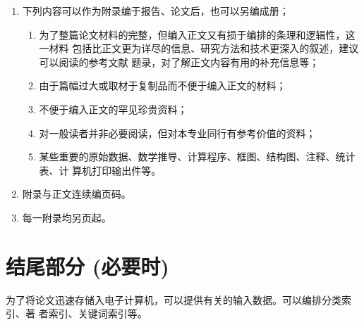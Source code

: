 \documentclass[oneside, phd]{njuthesis}
\begin{document}
\begin{enumerate}
\item 下列内容可以作为附录编于报告、论文后，也可以另编成册；

\begin{enumerate}

\item 为了整篇论文材料的完整，但编入正文又有损于编排的条理和逻辑性，这一材料
包括比正文更为详尽的信息、研究方法和技术更深入的叙述，建议可以阅读的参考文献
题录，对了解正文内容有用的补充信息等；

\item 由于篇幅过大或取材于复制品而不便于编入正文的材料；

\item 不便于编入正文的罕见珍贵资料；

\item 对一般读者并非必要阅读，但对本专业同行有参考价值的资料；

\item 某些重要的原始数据、数学推导、计算程序、框图、结构图、注释、统计表、计
算机打印输出件等。

\end{enumerate}

\item 附录与正文连续编页码。

\item 每一附录均另页起。

\end{enumerate}

\section{结尾部分 (必要时)}

为了将论文迅速存储入电子计算机，可以提供有关的输入数据。可以编排分类索引、著
者索引、关键词索引等。

\backmatter



%
%
\end{document}
